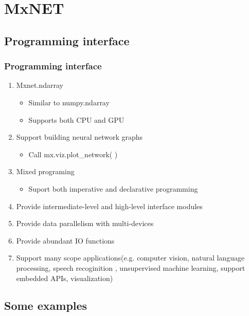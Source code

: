 
\section{MxNET}\label{sec:MxNet}

\subsection{Programming interface}

\begin{frame}
  \MyLogo
  \frametitle{Programming interface}  

\begin{enumerate}
\item Mxnet.ndarray 
\begin{itemize}
\item Similar to numpy.ndarray
\item Supports both CPU and GPU
\end{itemize}

\item Support building neural network graphs
\begin{itemize}
\item Call mx.viz.plot\_network( )
\end{itemize}

\item Mixed programing
\begin{itemize}
\item Suport both imperative and declarative programming 
\end{itemize}
\item Provide intermediate-level and high-level interface modules

\item Provide data parallelism with multi-devices 
%
\item Provide abundant IO functions 
%
\item Support many scope applications(e.g. computer vision, natural language processing,  speech recoginition , unsupervised machine learning, support embedded APIs, visualization)

\end{enumerate}

\end{frame}

\subsection{Some examples}

